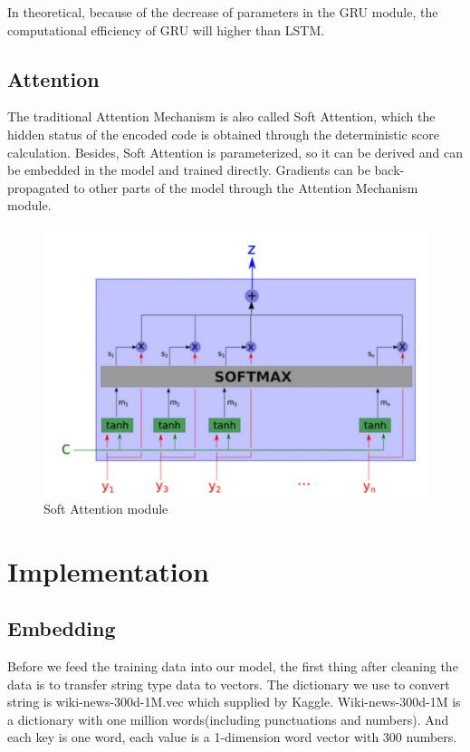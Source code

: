 \documentclass{article}
\begin{document}
\noindent In theoretical, because of the decrease of parameters in the GRU module, the computational efficiency of GRU will higher than LSTM. \\
\subsection{Attention}
\noindent The traditional Attention Mechanism is also called Soft Attention, which the hidden status of the encoded code is obtained through the deterministic score calculation. Besides, Soft Attention is parameterized, so it can be derived and can be embedded in the model and trained directly. Gradients can be back-propagated to other parts of the model through the Attention Mechanism module.\\
\begin{figure}[H]
	\centering
	\includegraphics[scale = 0.15]{s1.png}
	\caption{Soft Attention module}
\end{figure}

\section{ Implementation}
\subsection{Embedding}
\noindent Before we feed the training data into our model, the first thing after cleaning the data is to transfer string type data to vectors. The dictionary we use to convert string is wiki-news-300d-1M.vec which supplied by Kaggle. Wiki-news-300d-1M is a dictionary with one million words(including punctuations and numbers). And each key is one word, each value is a 1-dimension  word vector with 300 numbers.\\
\end{document}
